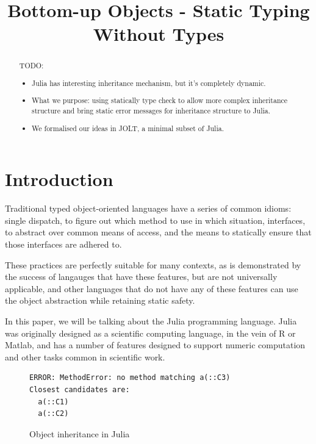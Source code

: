 \documentclass[preprint]{sigplanconf}
\begin{document}
\title{Bottom-up Objects - Static Typing Without Types} 
\maketitle

\begin{abstract}
TODO:
\begin{itemize}
\item Julia has interesting inheritance mechanism, but it's completely dynamic.
\item What we purpose: using statically type check to allow more complex inheritance structure and bring static error messages for inheritance structure to Julia.
\item We formalised our ideas in JOLT, a minimal subset of Julia.
\end{itemize}
\end{abstract}


\section{Introduction}

Traditional typed object-oriented languages have a series of
common idioms: single dispatch, to figure out which method
to use in which situation, interfaces, to abstract over 
common means of access, and the means to statically
ensure that those interfaces are adhered to.

These practices are perfectly suitable for many contexts,
as is demonstrated by the success of langauges that have 
these features, but are not universally applicable, and
other languages that do not have any of these features
can use the object abstraction while retaining static 
safety.

In this paper, we will be talking about the Julia
programming language. Julia was originally designed
as a scientific computing language, in the vein of 
R or Matlab, and has a number of features designed
to support numeric computation and other tasks common
in scientific work.

\begin{figure}[h]


\begin{Verbatim}[fontsize=\small]
ERROR: MethodError: no method matching a(::C3)
Closest candidates are:
  a(::C1)
  a(::C2)
\end{Verbatim}
\caption{Object inheritance in Julia}
\label{code:broken}
\end{figure}
\end{document}
